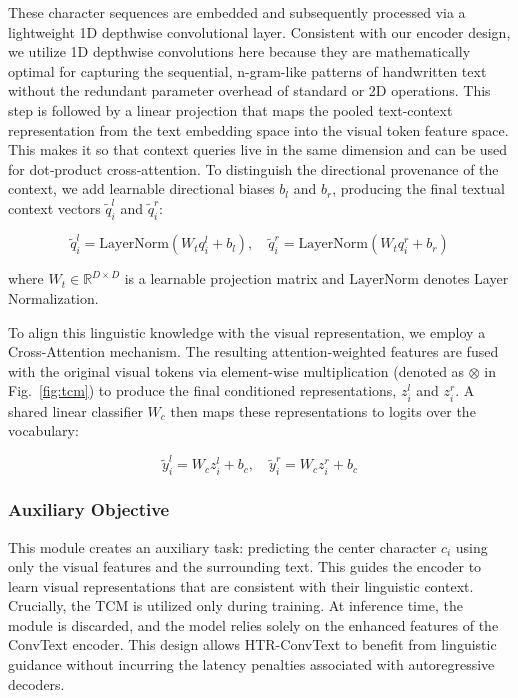 \documentclass[final,5p,times]{elsarticle}
\begin{document}
These character sequences are embedded and subsequently processed via a lightweight 1D depthwise convolutional layer. Consistent with our encoder design, we utilize 1D depthwise convolutions here because they are mathematically optimal for capturing the sequential, n-gram-like patterns of handwritten text without the redundant parameter overhead of standard or 2D operations. This step is followed by a linear projection that maps the pooled text-context representation from the text embedding space into the visual token feature space. This makes it so that context queries live in the same dimension and can be used for dot‑product cross‑attention. To distinguish the directional provenance of the context, we add learnable directional biases $b_l$ and $b_r$, producing the final textual context vectors $\tilde{q}_{i}^{l}$ and $\tilde{q}_{i}^{r}$:

\begin{equation}
    \tilde{q}_{i}^{l}=\text{LayerNorm}(W_{t}q_{i}^{l}+b_{l}), \quad \tilde{q}_{i}^{r}=\text{LayerNorm}(W_{t}q_{i}^{r}+b_{r})
\end{equation}

where $W_t \in \mathbb{R}^{D \times D}$ is a learnable projection matrix and $\text{LayerNorm}$ denotes Layer Normalization.

To align this linguistic knowledge with the visual representation, we employ a Cross-Attention mechanism. The resulting attention-weighted features are fused with the original visual tokens via element-wise multiplication (denoted as $\otimes$ in Fig.~\ref{fig:tcm}) to produce the final conditioned representations, $z_{i}^{l}$ and $z_{i}^{r}$. A shared linear classifier $W_c$ then maps these representations to logits over the vocabulary:

\begin{equation}
    \tilde{y}_{i}^{l}=W_{c}z_{i}^{l}+b_{c}, \quad \tilde{y}_{i}^{r}=W_{c}z_{i}^{r}+b_{c}
\end{equation}

\subsubsection{Auxiliary Objective}
This module creates an auxiliary task: predicting the center character $c_i$ using only the visual features and the surrounding text. This guides the encoder to learn visual representations that are consistent with their linguistic context. Crucially, the TCM is utilized only during training. At inference time, the module is discarded, and the model relies solely on the enhanced features of the ConvText encoder. This design allows HTR-ConvText to benefit from linguistic guidance without incurring the latency penalties associated with autoregressive decoders.
\end{document}
